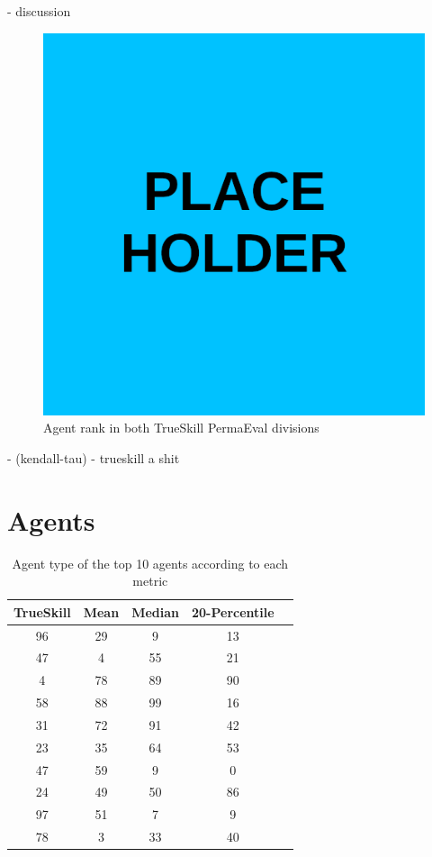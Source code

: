 \begin{code}
    - discussion
\end{code}
\begin{figure}[H]
\centering
    \includegraphics[width=0.8\linewidth]{Results/figures/placeholder.png}
\caption{Agent rank in both TrueSkill PermaEval divisions}
\label{AggTightRank}
\end{figure}
\begin{code}
    - (kendall-tau)
    - trueskill a shit
\end{code}

\section{Agents}
\begin{table}[H]
\centering
\begin{tabular}{|| c | c | c | c | c ||} 
 \hline
 TrueSkill & Mean & Median & 20-Percentile \\ [0.5ex] 
 \hline\hline
    96 &    29 &       9 &             13 \\
    47 &     4 &      55 &             21 \\
     4 &    78 &      89 &             90 \\
    58 &    88 &      99 &             16 \\
    31 &    72 &      91 &             42 \\
    23 &    35 &      64 &             53 \\
    47 &    59 &       9 &              0 \\
    24 &    49 &      50 &             86 \\
    97 &    51 &       7 &              9 \\
    78 &     3 &      33 &             40 \\ [1ex] 
 \hline
\end{tabular}
\label{TypeRankings}
\caption{Agent type of the top 10 agents according to each metric}
\end{table}

